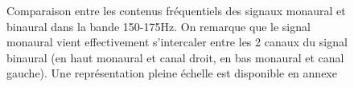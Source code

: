 \begin{figure}[h!]
	\caption{\label{comp_mon_min_zoom_150_175}Comparaison entre les contenus fréquentiels des signaux monaural et
	binaural dans la bande 150-175Hz. On remarque que le signal monaural vient effectivement s'intercaler entre les
	2 canaux du signal binaural (en haut monaural et canal droit, en bas monaural et canal gauche). Une représentation
pleine échelle est disponible en annexe}
\end{figure}


